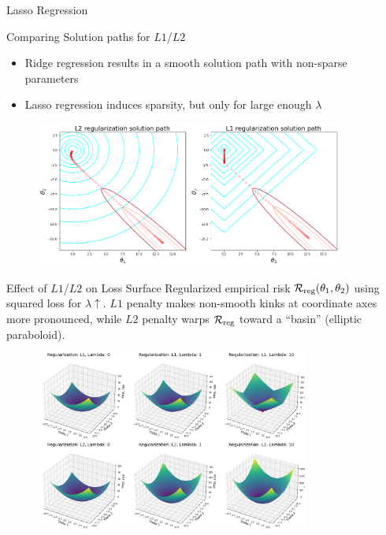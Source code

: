 \documentclass[11pt,compress,t,notes=noshow, xcolor=table]{beamer}
\begin{document}
\begin{vbframe}{Lasso Regression}
\end{vbframe}

\begin{vbframe}{Comparing Solution paths for $L1$/$L2$}
\begin{itemize}
    \item Ridge regression results in a smooth solution path with non-sparse parameters
    \item Lasso regression induces sparsity, but only for large enough $\lambda$
\end{itemize}
 \lz
\begin{figure}
\includegraphics[width=0.9\textwidth]{figure_man/solution-path-ridge-lasso.png}\\
\end{figure}

\end{vbframe}

\begin{vbframe}{Effect of $L1$/$L2$ on Loss Surface}
Regularized empirical risk $\mathcal{R}_{\text{reg}}(\theta_1,\theta_2)$ using squared loss for $\lambda \uparrow$. $L1$ penalty makes non-smooth kinks at coordinate axes more pronounced, while $L2$ penalty warps $\mathcal{R}_{\text{reg}}$ toward a ``basin'' (elliptic paraboloid). 
 
\begin{figure}
\includegraphics[width=0.8\textwidth]{figure/reg_surfaces_l1_l2.png}\\
\end{figure}

\end{vbframe}


\endlecture
\end{document}
